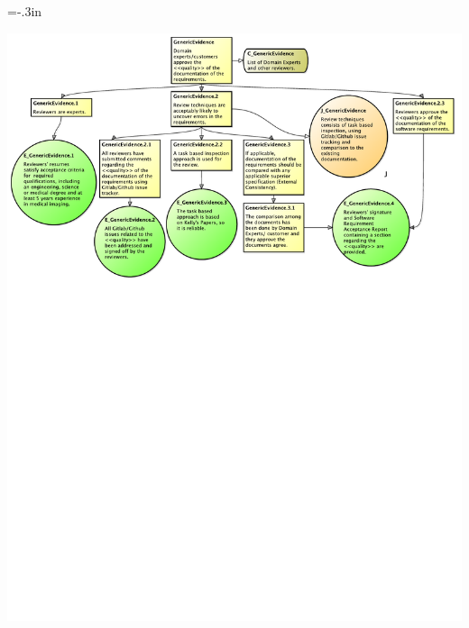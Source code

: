 \documentclass[t,12pt,numbers,fleqn]{beamer}
\begin{document}
\hoffset=-.3in
\begin{frame}[plain]

\includegraphics[width=1.15\textwidth]{../Figures/Generic.pdf}

\end{frame}
\hoffset=0in

\end{document}
